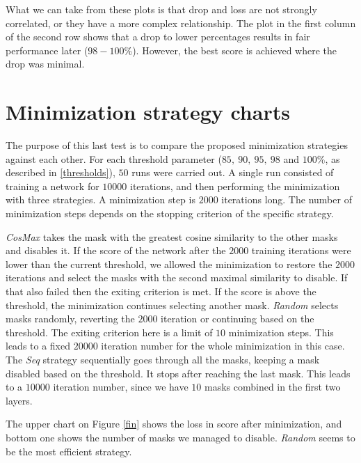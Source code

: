 \documentclass[12pt]{report}
\begin{document}
What we can take from these plots is that drop and loss are not strongly correlated, or they have a more complex relationship. The plot in the first column of the second row shows that a drop to lower percentages results in fair performance later ($98-100\%$). However, the best score is achieved where the drop was minimal.

\section{Minimization strategy charts}
The purpose of this last test is to compare the proposed minimization strategies against each other. For each threshold parameter ($ 85,\ 90,\ 95,\ 98$ and $100\%$, as described in \ref{thresholds}), $50$ runs were carried out. A single run consisted of training a network for $10000$
iterations, and then performing the minimization with three strategies. A minimization step is $2000$ iterations long. The number of minimization steps depends on the stopping criterion of the specific strategy.

\textit{CosMax} takes the mask with the greatest cosine similarity to the other masks and disables it. If the score of the network after the $2000$ training iterations were lower than the current threshold, we allowed the minimization to restore the $2000$ iterations and select the masks with the second maximal similarity to disable. If that also failed then the exiting criterion is met. If the score is above the threshold, the minimization continues selecting another mask. \textit{Random} selects masks randomly, reverting the $2000$ iteration or continuing based on the threshold. The exiting criterion here is a limit of $10$ minimization steps. This leads to a fixed $20000$ iteration number for the whole minimization in this case. The \textit{Seq} strategy sequentially goes through all the masks, keeping a mask disabled based on the threshold. It stops after reaching the last mask. This leads to a $10000$ iteration number, since we have $10$ masks combined in the first two layers.

The upper chart on Figure \ref{fin} shows the loss in score after minimization, and bottom one shows the number of masks we managed to disable. \textit{Random} seems to be the most efficient strategy.
\end{document}
